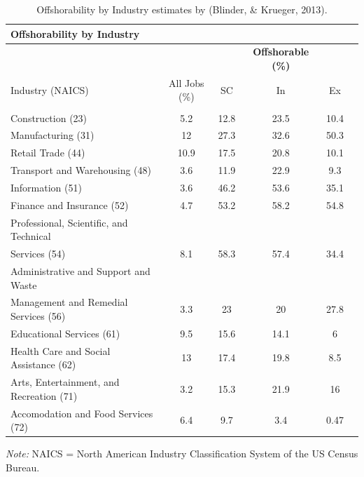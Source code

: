 \documentclass[12pt]{article}
\begin{document}
\begin{table}[!htbp] \centering 
\begin{threeparttable}
  \caption{Offshorability by Industry estimates by (Blinder, \& Krueger, 2013).} 
  \label{} 
\small
\begin{tabular}{@{\extracolsep{5pt}}lccccc} 
 \toprule
\textbf{Offshorability by Industry} \\
\midrule
& & & \textbf{Offshorable (\%)} \\
Industry (NAICS) & All Jobs (\%) & SC & In & Ex \\
\hline \\[-1.8ex] 
Construction (23) & 5.2 & 12.8 & 23.5 & 10.4 \\
Manufacturing (31) &  12 & 27.3	& 32.6 & 50.3 \\
Retail Trade (44) & 10.9 & 17.5 & 20.8	& 10.1 \\
Transport and Warehousing (48) & 3.6 & 11.9 & 22.9 & 9.3 \\
Information (51) & 3.6 & 46.2 & 53.6 & 35.1 \\
Finance and Insurance (52) & 4.7 & 53.2 & 58.2 & 54.8 \\
Professional, Scientific, and Technical & & & & \\
Services (54) & 8.1 & 58.3 & 57.4 & 34.4 \\
Administrative and Support and Waste & & & & \\
Management and Remedial Services (56) & 3.3 & 23 & 20 & 27.8 \\
Educational Services (61) & 9.5 & 15.6 & 14.1 & 6 \\
Health Care and Social Assistance (62) & 13 & 17.4 & 19.8 & 8.5 \\
Arts, Entertainment, and Recreation (71) & 3.2 & 15.3 & 21.9 & 16 \\
Accomodation and Food Services (72) & 6.4 & 9.7 & 3.4 & 0.47 \\
\bottomrule
 \end{tabular}
 \begin{tablenotes}
\item \textit{Note:} NAICS = North American Industry Classification System of the US Census Bureau.
\end{tablenotes}
\end{threeparttable}
\end{table}
\end{document}
